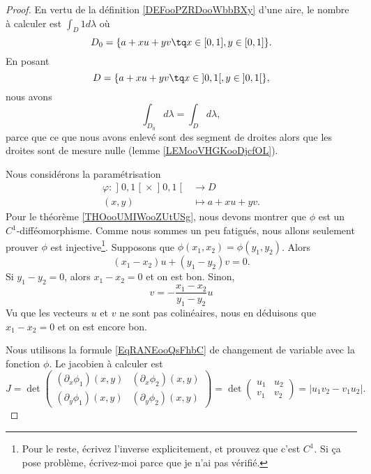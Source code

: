 \begin{proof}
	En vertu de la définition \ref{DEFooPZRDooWbbBXy} d'une aire, le nombre à calculer est \( \int_D1d\lambda\) où
	\begin{equation}
		D_0=\{ a+xu+yv\tq x\in \mathopen[ 0 , 1 \mathclose], y\in\mathopen[ 0 , 1 \mathclose] \}.
	\end{equation}
	En posant
	\begin{equation}
		D=\{ a+xu+yv\tq x\in \mathopen] 0 , 1 \mathclose[, y\in\mathopen] 0 , 1 \mathclose[ \},
	\end{equation}
	nous avons
	\begin{equation}
		\int_{D_0}d\lambda=\int_Dd\lambda,
	\end{equation}
	parce que ce que nous avons enlevé sont des segment de droites alors que les droites sont de mesure nulle (lemme \ref{LEMooVHGKooDjcfOL}).

	Nous considérons la paramétrisation
	\begin{equation}
		\begin{aligned}
			\varphi\colon \mathopen] 0 , 1 \mathclose[\times \mathopen] 0 , 1 \mathclose[ & \to D            \\
			(x,y)                                                                         & \mapsto a+xu+yv.
		\end{aligned}
	\end{equation}
	Pour le théorème \ref{THOooUMIWooZUtUSg}, nous devons montrer que \( \phi\) est un \( C^1\)-difféomorphisme. Comme nous sommes un peu fatigués, nous allons seulement prouver \( \phi\) est injective\footnote{Pour le reste, écrivez l'inverse explicitement, et prouvez que c'est \( C^1\). Si ça pose problème, écrivez-moi parce que je n'ai pas vérifié.}. Supposons que \( \phi(x_1, x_2)=\phi(y_1, y_2)\). Alors
	\begin{equation}
		(x_1-x_2)u+(y_1-y_2)v=0.
	\end{equation}
	Si \( y_1-y_2=0\), alors \( x_1-x_2=0\) et on est bon. Sinon,
	\begin{equation}
		v=-\frac{ x_1-x_2 }{ y_1-y_2 }u
	\end{equation}
	Vu que les vecteurs \( u\) et \( v\) ne sont pas colinéaires, nous en déduisons que \( x_1-x_2=0\) et on est encore bon.

	Nous utilisons la formule \eqref{EqRANEooQsFhbC} de changement de variable avec la fonction \( \phi\). Le jacobien à calculer est
	\begin{equation}
		J=\det\begin{pmatrix}
			(\partial_x\phi_1)(x,y) & (\partial_x\phi_2)(x,y) \\
			(\partial_y\phi_1)(x,y) & (\partial_y\phi_2)(x,y)
		\end{pmatrix}=\det\begin{pmatrix}
			u_1 & u_2 \\
			v_1 & v_2
		\end{pmatrix}=| u_1v_2-v_1u_2 |.
	\end{equation}


\end{proof}
